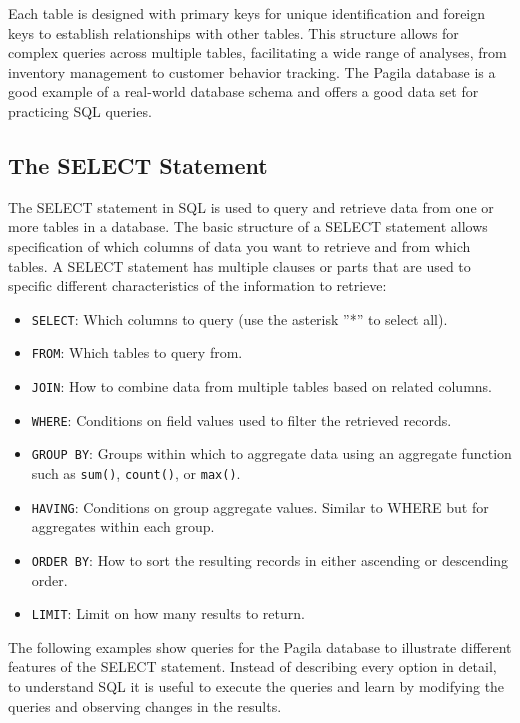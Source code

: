 Each table is designed with primary keys for unique identification and foreign keys to establish relationships with other tables. This structure allows for complex queries across multiple tables, facilitating a wide range of analyses, from inventory management to customer behavior tracking. The Pagila database is a good example of a real-world database schema and offers a good data set for practicing SQL queries.

\subsection*{The SELECT Statement}

The SELECT statement in SQL is used to query and retrieve data from one or more tables in a database. The basic structure of a SELECT statement allows specification of which columns of data you want to retrieve and from which tables. A SELECT statement has multiple clauses or parts that are used to specific different characteristics of the information to retrieve:

\begin{itemize}
 \item \texttt{SELECT}: Which columns to query (use the asterisk ''*'' to select all).
 \item \texttt{FROM}: Which tables to query from.
 \item \texttt{JOIN}: How to combine data from multiple tables based on related columns.
 \item \texttt{WHERE}: Conditions on field values used to filter the retrieved records.
 \item \texttt{GROUP BY}: Groups within which to aggregate data using an aggregate function such as \texttt{sum()}, \texttt{count()}, or \texttt{max()}.
 \item \texttt{HAVING}: Conditions on group aggregate values. Similar to WHERE but for aggregates within each group.
 \item \texttt{ORDER BY}: How to sort the resulting records in either ascending or descending order.
 \item \texttt{LIMIT}: Limit on how many results to return.
\end{itemize}

The following examples show queries for the Pagila database to illustrate different features of the SELECT statement. Instead of describing every option in detail, to understand SQL it is useful to execute the queries and learn by modifying the queries and observing changes in the results. 

